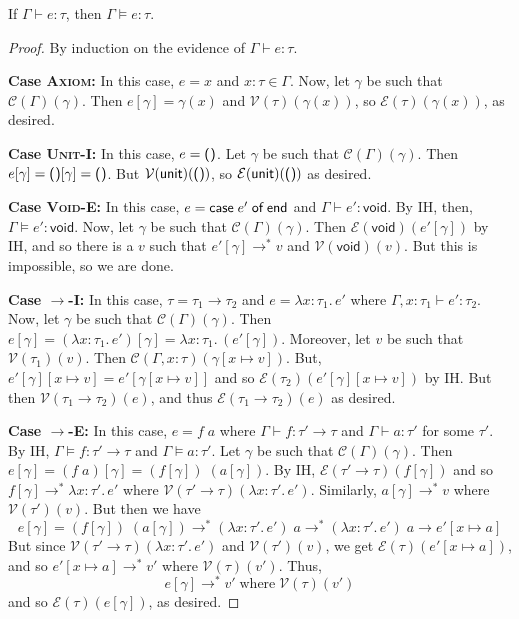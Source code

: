 \documentclass{lecturenotes}
\newcommand{\tabs}[3]{\ensuremath{\lambda #1 \colon #2.\,#3}}
\newcommand{\app}[2]{\ensuremath{#1\;#2}}
\newcommand{\utype}{\textsf{unit}\xspace}
\newcommand{\unit}{\ensuremath{\textsf{(}\mkern0.5mu\textsf{)}}}
\newcommand{\vtype}{\textsf{void}\xspace}
\newcommand{\vcase}[1]{\ensuremath{\textsf{case}\mkern5mu#1\mkern5mu\textsf{of}\mkern5mu\textsf{end}}}
\begin{document}
\newpage
\begin{thm}
  If $\Gamma \vdash e : \tau$, then $\Gamma \vDash e : \tau$.
\end{thm}
\begin{proof}
  By induction on the evidence of $\Gamma \vdash e : \tau$.

  \noindent \textbf{Case \textsc{Axiom}:}
  In this case, $e = x$ and $x : \tau \in \Gamma$.
  Now, let $\gamma$ be such that $\mathcal{C}(\Gamma)(\gamma)$.
  Then $e[\gamma] = \gamma(x)$ and $\mathcal{V}(\tau)(\gamma(x))$, so $\mathcal{E}(\tau)(\gamma(x))$, as desired.

  \noindent\textbf{Case \textsc{Unit-I}:}
  In this case, $e = \unit$.
  Let $\gamma$ be such that $\mathcal{C}(\Gamma)(\gamma)$.
  Then $e[\gamma] = \unit[\gamma] = \unit$.
  But $\mathcal{V}(\utype)(\unit)$, so $\mathcal{E}(\utype)(\unit)$ as desired.

  \noindent\textbf{Case \textsc{Void-E}:}
  In this case, $e = \vcase{e'}$ and $\Gamma \vdash e' : \vtype$.
  By IH, then, $\Gamma \vDash e' : \vtype$.
  Now, let $\gamma$ be such that $\mathcal{C}(\Gamma)(\gamma)$.
  Then $\mathcal{E}(\vtype)(e'[\gamma])$ by IH, and so there is a $v$ such that $e'[\gamma] \to^\ast v$ and $\mathcal{V}(\vtype)(v)$.
  But this is impossible, so we are done.

  \noindent\textbf{Case \textsc{$\to$-I}:}
  In this case, $\tau = \tau_1 \to \tau_2$ and $e = \tabs{x}{\tau_1}{e'}$ where $\Gamma, x : \tau_1 \vdash e' : \tau_2$.
  Now, let $\gamma$ be such that $\mathcal{C}(\Gamma)(\gamma)$.
  Then $e[\gamma] = (\tabs{x}{\tau_1}{e'})[\gamma] = \tabs{x}{\tau_1}{(e'[\gamma])}$.
  Moreover, let $v$ be such that $\mathcal{V}(\tau_1)(v)$.
  Then $\mathcal{C}(\Gamma, x : \tau)(\gamma[x \mapsto v])$.
  But, $e'[\gamma][x \mapsto v] = e'[\gamma[x \mapsto v]]$ and so $\mathcal{E}(\tau_2)(e'[\gamma][x \mapsto v])$ by IH.
  But then $\mathcal{V}(\tau_1 \to \tau_2)(e)$, and thus $\mathcal{E}(\tau_1 \to \tau_2)(e)$ as desired.

  \noindent\textbf{Case \textsc{$\to$-E}:}
  In this case, $e = \app{f}{a}$ where $\Gamma \vdash f : \tau' \to \tau$ and $\Gamma \vdash a : \tau'$ for some $\tau'$.
  By IH, $\Gamma \vDash f : \tau' \to \tau$ and $\Gamma \vDash a : \tau'$.
  Let $\gamma$ be such that $\mathcal{C}(\Gamma)(\gamma)$.
  Then $e[\gamma] = (\app{f}{a})[\gamma] = \app{(f[\gamma])}{(a[\gamma])}$.
  By IH, $\mathcal{E}(\tau' \to \tau)(f[\gamma])$ and so $f[\gamma] \to^\ast \tabs{x}{\tau'}{e'}$ where $\mathcal{V}(\tau' \to \tau)(\tabs{x}{\tau'}{e'})$.
  Similarly, $a[\gamma] \to^\ast v$ where $\mathcal{V}(\tau')(v)$.
  But then we have $$e[\gamma] = \app{(f[\gamma])}{(a[\gamma])} \to^\ast \app{(\tabs{x}{\tau'}{e'})}{a} \to^\ast \app{(\tabs{x}{\tau'}{e'})}{a} \to e'[x \mapsto a]$$
  But since $\mathcal{V}(\tau' \to \tau)(\tabs{x}{\tau'}{e'})$ and $\mathcal{V}(\tau')(v)$, we get $\mathcal{E}(\tau)(e'[x \mapsto a])$, and so $e'[x \mapsto a] \to^\ast v'$ where $\mathcal{V}(\tau)(v')$.
  Thus, $$e[\gamma] \to^\ast v' \mathrel{\text{where}} \mathcal{V}(\tau)(v')$$ and so $\mathcal{E}(\tau)(e[\gamma])$, as desired.


\end{proof}
\end{document}

